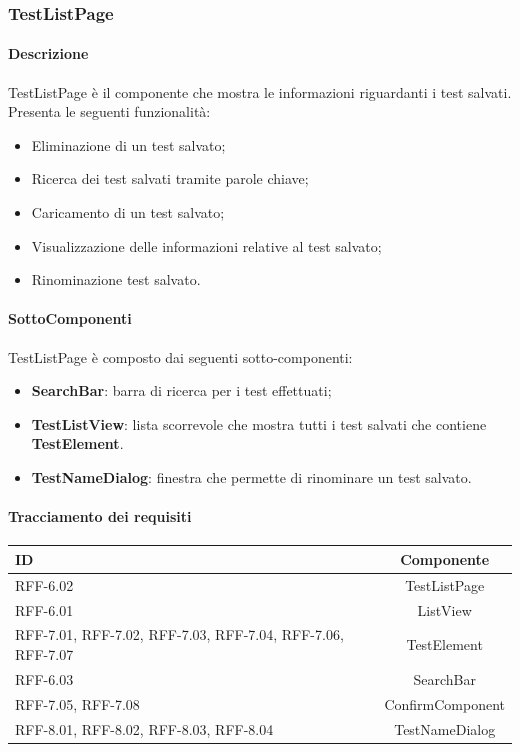 \subsubsection{TestListPage}
\label{sec:TestListPage}
\paragraph{Descrizione}
TestListPage è il componente che mostra le informazioni riguardanti i test salvati. Presenta le seguenti funzionalità:
\begin{itemize}
    \item Eliminazione di un test salvato;
    \item Ricerca dei test salvati tramite parole chiave;
    \item Caricamento di un test salvato;
    \item Visualizzazione delle informazioni relative al test salvato;
    \item Rinominazione test salvato.
\end{itemize}

\paragraph{SottoComponenti}
TestListPage è composto dai seguenti sotto-componenti:
\begin{itemize}
    \item \textbf{SearchBar}: barra di ricerca per i test effettuati;
    \item \textbf{TestListView}: lista scorrevole che mostra tutti i test salvati che contiene \textbf{TestElement}.
    \item \textbf{TestNameDialog}: finestra che permette di rinominare un test salvato.
\end{itemize}

\paragraph{Tracciamento dei requisiti}
\begin{tabularx}{\textwidth}{|X|c|}
    \hline
    \textbf{ID} & \textbf{Componente} \\
    \hline
        RFF-6.02 & TestListPage\\
    \hline
        RFF-6.01 & ListView\\
    \hline
        RFF-7.01, RFF-7.02, RFF-7.03, RFF-7.04, RFF-7.06, RFF-7.07 & TestElement\\
    \hline
        RFF-6.03 & SearchBar\\
    \hline
        RFF-7.05, RFF-7.08 & ConfirmComponent \\
    \hline 
        RFF-8.01, RFF-8.02, RFF-8.03, RFF-8.04 & TestNameDialog \\
    \hline
\end{tabularx}